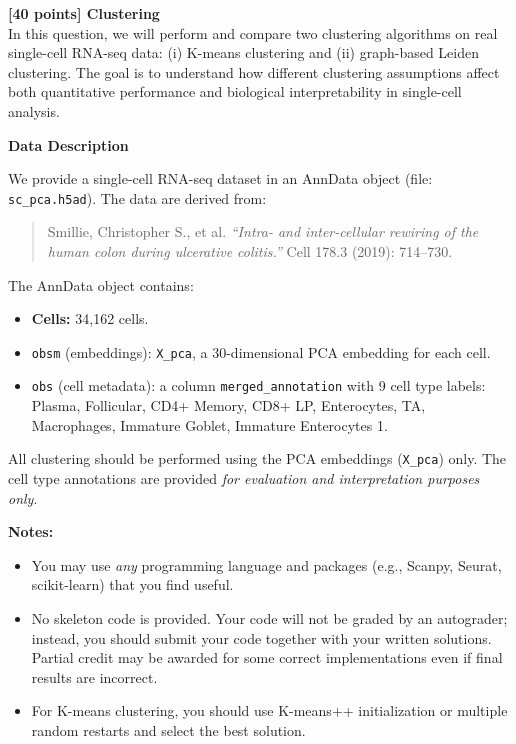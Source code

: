 {\bf [40 points] Clustering}\\

In this question, we will perform and compare two clustering algorithms on real single-cell RNA-seq data: (i) K-means clustering and (ii) graph-based Leiden clustering. The goal is to understand how different clustering assumptions affect both quantitative performance and biological interpretability in single-cell analysis.

\textbf{Data Description}

We provide a single-cell RNA-seq dataset in an AnnData object (file: \texttt{sc\_pca.h5ad}). The data are derived from:

\begin{quote}
Smillie, Christopher S., et al. \emph{``Intra- and inter-cellular rewiring of the human colon during ulcerative colitis.''} Cell 178.3 (2019): 714--730.
\end{quote}

The AnnData object contains:

\begin{itemize}
    \item \textbf{Cells:} 34{,}162 cells.
    \item \texttt{obsm} (embeddings): \texttt{X\_pca}, a 30-dimensional PCA embedding for each cell.
    \item \texttt{obs} (cell metadata): a column \texttt{merged\_annotation} with 9 cell type labels:
    Plasma, Follicular, CD4+ Memory, CD8+ LP, Enterocytes, TA, Macrophages, Immature Goblet, Immature Enterocytes 1.
\end{itemize}

All clustering should be performed using the PCA embeddings (\texttt{X\_pca}) only. The cell type annotations are provided \emph{for evaluation and interpretation purposes only}.

\textbf{Notes:}
\begin{itemize}
    \item You may use \emph{any} programming language and packages (e.g., Scanpy, Seurat, scikit-learn) that you find useful.
    \item No skeleton code is provided. Your code will not be graded by an autograder; instead, you should submit your code together with your written solutions. Partial credit may be awarded for some correct implementations even if final results are incorrect.
    \item For K-means clustering, you should use K-means++ initialization or multiple random restarts and select the best solution.
\end{itemize}


